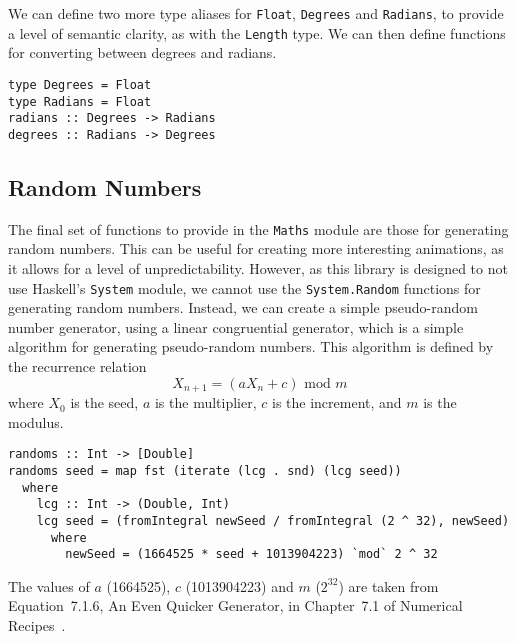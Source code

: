 \documentclass[../main.tex]{subfiles}
\begin{document}
            We can define two more type aliases for \texttt{Float}, \texttt{Degrees} and
                \texttt{Radians}, to provide a level of semantic clarity, as with the
                \texttt{Length} type.
            We can then define functions for converting between degrees and radians.

            \begin{lstlisting}[label={lst:angleFns}, caption={The angle functions.}]  
type Degrees = Float
type Radians = Float                
radians :: Degrees -> Radians
degrees :: Radians -> Degrees\end{lstlisting}

        \subsection{Random Numbers}
            The final set of functions to provide in the \texttt{Maths} module are those
                for generating random numbers.
            This can be useful for creating more interesting animations, as it allows for a
                level of unpredictability.
            However, as this library is designed to not use Haskell's \texttt{System}
                module, we cannot use the \texttt{System.Random} functions for generating
                random numbers.
            Instead, we can create a simple pseudo-random number generator, using a linear
                congruential generator, which is a simple algorithm for generating
                pseudo-random numbers.
            This algorithm is defined by the recurrence relation $$X_{n+1} = (aX_n + c)
                    \text{ mod } m$$ where $X_0$ is the seed, $a$ is the multiplier, $c$ is the
                increment, and $m$ is the modulus.

            \begin{lstlisting}[label={lst:random}, caption={The random number generator, 
                (\texttt{randoms}) which uses a linear congruential generator to generate an 
                infinite list of pseudo-random numbers, mapped to the range [0, 1].}]
randoms :: Int -> [Double]
randoms seed = map fst (iterate (lcg . snd) (lcg seed))
  where
    lcg :: Int -> (Double, Int)
    lcg seed = (fromIntegral newSeed / fromIntegral (2 ^ 32), newSeed)
      where
        newSeed = (1664525 * seed + 1013904223) `mod` 2 ^ 32\end{lstlisting}

            The values of $a$ (1664525), $c$ (1013904223) and $m$ ($2^32$) are taken from
                Equation~7.1.6, An Even Quicker Generator, in Chapter~7.1 of Numerical
                Recipes~\citep{numericalRecipes}.
\end{document}
